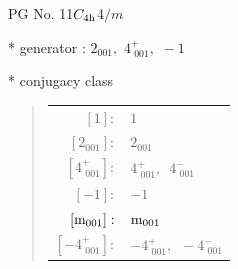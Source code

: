 \documentclass[fleqn,8pt]{jsarticle}
\begin{document}
\setcounter{MaxMatrixCols}{32}

\renewcommand{\tablename}{Table~}
\renewcommand{\figurename}{Figure~}
\begin{center}
\LARGE
PG No. 11\quad$C_{\rm 4h}$\quad$4/m$\quad[ tetragonal ]
\end{center}

* generator : $2{}_{001},\,\,4^{+}_{\,\,001},\,\,-1$

* conjugacy class
\begin{quote}
\begin{tabular}{rl}
$ [1]: $ & $ 1 $ \\
$ [2{}_{001}]: $ & $ 2{}_{001} $ \\
$ [4^{+}_{\,\,001}]: $ & $ 4^{+}_{\,\,001},\,\,\,4^{-}_{\,\,001} $ \\
$ [-1]: $ & $ -1 $ \\
$ [{\rm m}_{001}]: $ & $ {\rm m}_{001} $ \\
$ [-4^{+}_{\,\,001}]: $ & $ -4^{+}_{\,\,001},\,\,\,-4^{-}_{\,\,001} $
\end{tabular}
\end{quote}
\end{document}
